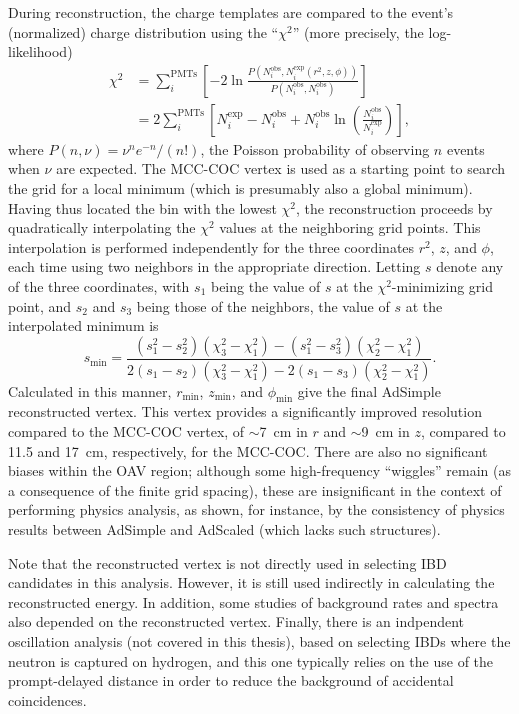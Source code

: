 \documentclass[../thesis.tex]{subfiles}
\begin{document}
\newcommand\Niobs{N_i^{\mathrm{obs}}}
\newcommand\Niexp{N_i^{\mathrm{exp}}}

During reconstruction, the charge templates are compared to the event's (normalized) charge distribution using the ``$\chi^2$'' (more precisely, the log-likelihood)
\begin{align*}
  \chi^2 &= \sum_i^{\mathrm{PMTs}}\left[ -2 \ln \frac{P(\Niobs, \Niexp(r^2, z, \phi))}
        {P(\Niobs, \Niobs)} \right] \\
      &= 2 \sum_i^{\mathrm{PMTs}} \left[ \Niexp - \Niobs+ \Niobs \ln \left( \frac{\Niobs}{\Niexp} \right) \right],
\end{align*}
where $P(n, \nu) = \nu^n e^{-n} / (n!)$, the Poisson probability of observing $n$ events when $\nu$ are expected. The MCC-COC vertex is used as a starting point to search the grid for a local minimum (which is presumably also a global minimum). Having thus located the bin with the lowest $\chi^2$, the reconstruction proceeds by quadratically interpolating the $\chi^2$ values at the neighboring grid points. This interpolation is performed independently for the three coordinates $r^2$, $z$, and $\phi$, each time using two neighbors in the appropriate direction. Letting $s$ denote any of the three coordinates, with $s_1$ being the value of $s$ at the $\chi^2$-minimizing grid point, and $s_2$ and $s_3$ being those of the neighbors, the value of $s$ at the interpolated minimum is
\begin{equation*}
  s_{\mathrm{min}} = \frac{(s_1^2 - s_2^2)(\chi_3^2 - \chi_1^2) - (s_1^2 - s_3^2)(\chi_2^2 - \chi_1^2)}{2(s_1 - s_2)(\chi_3^2 - \chi_1^2) - 2(s_1 - s_3)(\chi_2^2 - \chi_1^2)}.
\end{equation*}
Calculated in this manner, $r_{\mathrm{min}}$, $z_{\mathrm{min}}$, and $\phi_{\mathrm{min}}$ give the final AdSimple reconstructed vertex. This vertex provides a significantly improved resolution compared to the MCC-COC vertex, of $\sim$7~cm in $r$ and $\sim$9~cm in $z$, compared to 11.5 and 17~cm, respectively, for the MCC-COC. There are also no significant biases within the OAV region; although some high-frequency ``wiggles'' remain (as a consequence of the finite grid spacing), these are insignificant in the context of performing physics analysis, as shown, for instance, by the consistency of physics results between AdSimple and AdScaled (which lacks such structures).

Note that the reconstructed vertex is not directly used in selecting IBD candidates in this analysis. However, it is still used indirectly in calculating the reconstructed energy. In addition, some studies of background rates and spectra also depended on the reconstructed vertex. Finally, there is an indpendent oscillation analysis (not covered in this thesis), based on selecting IBDs where the neutron is captured on hydrogen, and this one typically relies on the use of the prompt-delayed distance in order to reduce the background of accidental coincidences.
\end{document}
